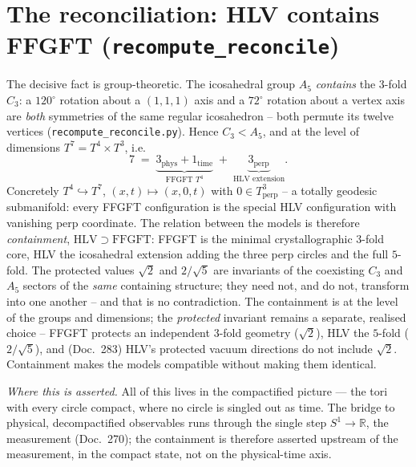 \section{The reconciliation: HLV contains FFGFT (\texttt{recompute\_reconcile})}
The decisive fact is group-theoretic. The icosahedral group $A_5$ \emph{contains} the
$3$-fold $C_3$: a $120^\circ$ rotation about a $(1,1,1)$ axis and a $72^\circ$ rotation
about a vertex axis are \emph{both} symmetries of the same regular icosahedron -- both
permute its twelve vertices (\texttt{recompute\_reconcile.py}). Hence $C_3<A_5$, and at the
level of dimensions $T^7=T^4\times T^3$, i.e.
\begin{equation}
7 \;=\; \underbrace{3_{\text{phys}}+1_{\text{time}}}_{\text{FFGFT }T^4}\;+\;\underbrace{3_{\text{perp}}}_{\text{HLV extension}}.
\end{equation}
Concretely $T^4\hookrightarrow T^7$, $(x,t)\mapsto(x,0,t)$ with $0\in T^3_{\text{perp}}$ -- a totally geodesic submanifold: every FFGFT configuration is the special HLV configuration with vanishing perp coordinate. The relation between the models is therefore \emph{containment}, $\mathrm{HLV}\supset
\mathrm{FFGFT}$: FFGFT is the minimal crystallographic $3$-fold core, HLV the icosahedral
extension adding the three perp circles and the full $5$-fold. The protected values $\sqrt2$
and $2/\sqrt5$ are invariants of the coexisting $C_3$ and $A_5$ sectors of the \emph{same}
containing structure; they need not, and do not, transform into one another -- and that is
no contradiction. The containment is at the level of the groups and dimensions; the
\emph{protected} invariant remains a separate, realised choice -- FFGFT protects an
independent $3$-fold geometry ($\sqrt2$), HLV the $5$-fold ($2/\sqrt5$), and (Doc.~283)
HLV's protected vacuum directions do not include $\sqrt2$. Containment makes the models
compatible without making them identical.

\medskip\noindent\emph{Where this is asserted.} All of this lives in the compactified picture --- the tori with every circle compact, where no circle is singled out as time. The bridge to physical, decompactified observables runs through the single step $S^1\to\mathbb{R}$, the measurement (Doc.~270); the containment is therefore asserted upstream of the measurement, in the compact state, not on the physical-time axis.

